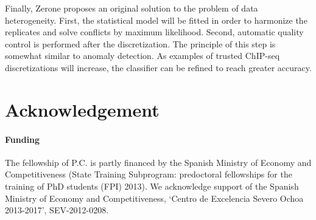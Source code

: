 \documentclass{bioinfo}
\begin{document}
Finally, Zerone proposes an original solution to the problem of
data heterogeneity. First, the statistical model will be fitted
in order to harmonize the replicates and solve conflicts by maximum
likelihood. Second, automatic quality control is performed
after the discretization. The principle of this step is somewhat
similar to anomaly detection. As examples of trusted ChIP-seq
discretizations will increase, the classifier can be refined to
reach greater accuracy.

\section*{Acknowledgement}
\paragraph{Funding\textcolon}
The fellowship of P.C. is partly financed by the Spanish Ministry
of Economy and Competitiveness (State Training Subprogram: predoctoral
fellowships for the training of PhD students (FPI) 2013).
We acknowledge support of the Spanish Ministry of Economy and
Competitiveness, `Centro de Excelencia Severo Ochoa 2013-2017',
SEV-2012-0208.



\end{document}

